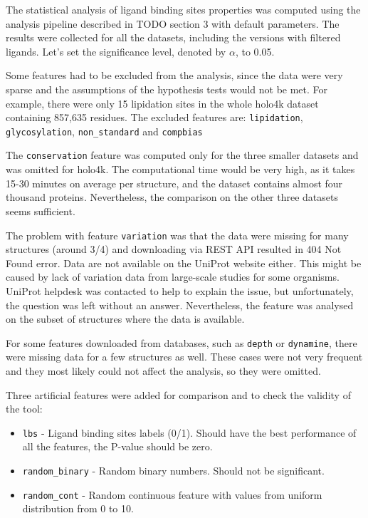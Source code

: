 The statistical analysis of ligand binding sites properties was computed using the analysis pipeline described in TODO section 3 with default parameters. The results were collected for all the datasets, including the versions with filtered ligands. Let's set the significance level, denoted by $\alpha$, to 0.05.

Some features had to be excluded from the analysis, since the data were very sparse and the assumptions of the hypothesis tests would not be met. For example, there were only 15 lipidation sites in the whole holo4k dataset containing  857,635 residues. The excluded features are: \texttt{lipidation}, \texttt{glycosylation}, \texttt{non\_standard} and \texttt{compbias}

The \texttt{conservation} feature was computed only for the three smaller datasets and was omitted for holo4k. The computational time would be very high, as it takes 15-30 minutes on average per structure, and the dataset contains almost four thousand proteins. Nevertheless, the comparison on the other three datasets seems sufficient.

The problem with feature \texttt{variation} was that the data were missing for many structures (around 3/4) and downloading via REST API resulted in 404 Not Found error. Data are not available on the UniProt website either. This might be caused by lack of variation data from large-scale studies for some organisms. UniProt helpdesk was contacted to help to explain the issue, but unfortunately, the question was left without an answer. Nevertheless, the feature was analysed on the subset of structures where the data is available.

For some features downloaded from databases, such as \texttt{depth} or \texttt{dynamine}, there were missing data for a few structures as well. These cases were not very frequent and they most likely could not affect the analysis, so they were omitted.

Three artificial features were added for comparison and to check the validity of the tool:
\begin{itemize}
  \item \texttt{lbs} - Ligand binding sites labels (0/1). Should have the best performance of all the features, the P-value should be zero.
  \item \texttt{random\_binary} - Random binary numbers. Should not be significant.
  \item \texttt{random\_cont} - Random continuous feature with values from uniform distribution from 0 to 10.
\end{itemize}

